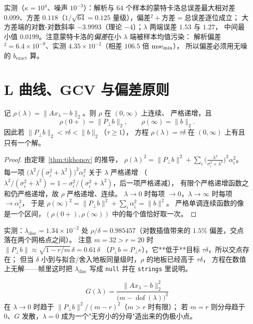 实测（$\kappa=10^4$、噪声 $10^{-3}$）：解析与 $64$ 个样本的蒙特卡洛总误差最大相对差
$0.099$、方差 $0.118$（$1/\sqrt{64}=0.125$ 量级），偏差$^2+$方差$=$总误差逐位成立；
大方差端的对数-对数斜率 $-3.9993$（理论 $-4$）；$\lambda$ 两端误差 $1.53$ 与 $1.27$，
中间最小值 $0.0199$。注意蒙特卡洛的\emph{偏差}在小 $\lambda$ 端被样本均值污染：
解析偏差$^2=6.4\times10^{-9}$、实测 $4.35\times10^{-2}$（相差 $106.5$ 倍 ${\rm mse}_{\min}$），
所以偏差必须用无噪的 $b_{\text{exact}}$ 算。

\section{L 曲线、GCV 与偏差原则}

\begin{theorem}
\label{thm:discrepancy}
记 $\rho(\lambda)=\lVert Ax_\lambda-b\rVert_2$。则 $\rho$ 在 $(0,\infty)$ 上连续、
严格递增，且
\[
  \rho(0+)=\lVert P_\perp b\rVert_2,\qquad \rho(\infty)=\lVert b\rVert_2 .
\]
因此若 $\lVert P_\perp b\rVert_2<\tau\delta<\lVert b\rVert_2$（$\tau\ge1$），
方程 $\rho(\lambda)=\tau\delta$ 在 $(0,\infty)$ 上有且只有一个解。
\end{theorem}

\begin{proof}
由定理~\ref{thm:tikhonov} 的推导，
$\rho(\lambda)^2=\lVert P_\perp b\rVert^2+\sum_i\bigl(\frac{\lambda^2}{\sigma_i^2+\lambda^2}\bigr)^2\alpha_i^2$。
每一项 $\bigl(\lambda^2/(\sigma_i^2+\lambda^2)\bigr)^2\alpha_i^2$ 关于 $\lambda$ 严格递增
（$\lambda^2/(\sigma_i^2+\lambda^2)=1-\sigma_i^2/(\sigma_i^2+\lambda^2)$，后一项严格递减），
有限个严格递增函数之和仍严格递增，故 $\rho$ 严格递增、连续。
$\lambda\to0$ 时每项 $\to0$，$\lambda\to\infty$ 时每项 $\to\alpha_i^2$，
于是 $\rho(\infty)^2=\lVert P_\perp b\rVert^2+\sum_i\alpha_i^2=\lVert b\rVert^2$。
严格单调连续函数的像是一个区间，$(\rho(0+),\rho(\infty))$ 中的每个值恰好取一次。
\end{proof}

实测：$\lambda_{\text{disc}}=1.34\times10^{-2}$ 处
$\rho/\delta=0.985457$（对数插值带来的 $1.5\%$ 偏差，交点落在两个网格点之间）。
注意 $m=32>r=20$ 时 $\lVert P_\perp b\rVert\approx\sqrt{1-r/m}\,\delta=0.61\,\delta$
（$P_\perp b=P_\perp e$），它**低于**目标 $\tau\delta$，所以交点存在；
但当 $\delta$ 小到与拟合/舍入地板同量级时，$\rho$ 的地板已经高于 $\tau\delta$，
方程在数值上无解——帧里这时把 $\lambda_{\text{disc}}$ 写成 \texttt{null} 并在 \texttt{strings} 里说明。

\begin{theorem}
\label{thm:gcv}
\[
  G(\lambda)=\frac{\lVert Ax_\lambda-b\rVert_2^2}{\bigl(m-\operatorname{dof}(\lambda)\bigr)^2}
\]
在 $\lambda\to0$ 时趋于 $\lVert P_\perp b\rVert^2/(m-r)^2$（$m>r$ 时有限）；
若 $m=r$ 则分母趋于 $0$、$G$ 发散，$\lambda=0$ 成为一个"无穷小的分母"造出来的伪极小点。
\end{theorem}

